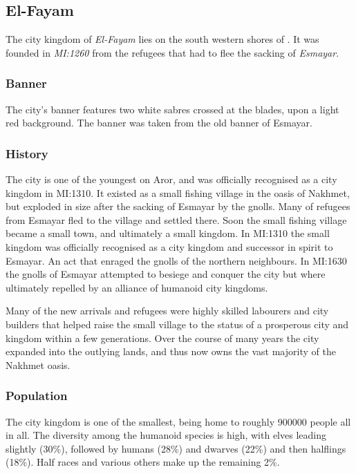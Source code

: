 \subsection{El-Fayam}
\label{sec:El-Fayam}

The city kingdom of \emph{El-Fayam} lies on the south western shores of
. It was founded in \emph{MI:1260} from the refugees that
had to flee the sacking of \emph{Esmayar}.

\subsubsection{Banner}

The city's banner features two white sabres crossed at the blades, upon
a light red background. The banner was taken from the old banner of Esmayar.

\subsubsection{History}

The city is one of the youngest on Aror, and was officially recognised as a
city kingdom in MI:1310. It existed as a small fishing village in the oasis of
Nakhmet, but exploded in size after the sacking of Esmayar by the gnolls. Many
of refugees from Esmayar fled to the village and settled there. Soon the small
fishing village became a small town, and ultimately a small kingdom. In
MI:1310 the small kingdom was officially recognised as a city kingdom and
successor in spirit to Esmayar. An act that enraged the gnolls of the northern
neighbours. In MI:1630 the gnolls of Esmayar attempted to besiege and conquer
the city but where ultimately repelled by an alliance of humanoid city
kingdoms.

Many of the new arrivals and refugees were highly skilled labourers and city
builders that helped raise the small village to the status of a prosperous
city and kingdom within a few generations. Over the course of many years the
city expanded into the outlying lands, and thus now owns the vast majority of
the Nakhmet oasis.

\subsubsection{Population}

The city kingdom is one of the smallest, being home to roughly 900000
people all in all. The diversity among the humanoid species is high, with
elves leading slightly (30\%), followed by humans (28\%) and dwarves (22\%)
and then halflings (18\%). Half races and various others make up the remaining
2\%.

